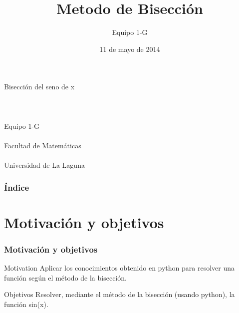 \documentclass{beamer}
\title[Método de Bisección]{Metodo de Bisección}
\author[Equipo 1 G]{Equipo 1-G}
\date[11-05-2014]{11 de mayo de 2014}
\begin{document}
  

\begin{frame}

  \begin{small}
    \begin{center}
     Bisección del seno de x \\\\\\
     \\Equipo 1-G \\
     \\Facultad de Matemáticas \\
     \\Universidad de La Laguna \\
    \end{center}
  \end{small}

\end{frame}


\begin{frame}
  \frametitle{Índice}  
  \tableofcontents[pausesections]
\end{frame}


\section{Motivación y objetivos}
\begin{frame}

\frametitle{Motivación y objetivos}
\begin{block}{Motivation}
    Aplicar los conocimientos obtenido en python para resolver una función según el método de la bisección.
\end{block}

\begin{block}{Objetivos}
     Resolver, mediante el método de la bisección (usando python), la función sin(x).
\end{block}

\end{frame}

\end{document}
